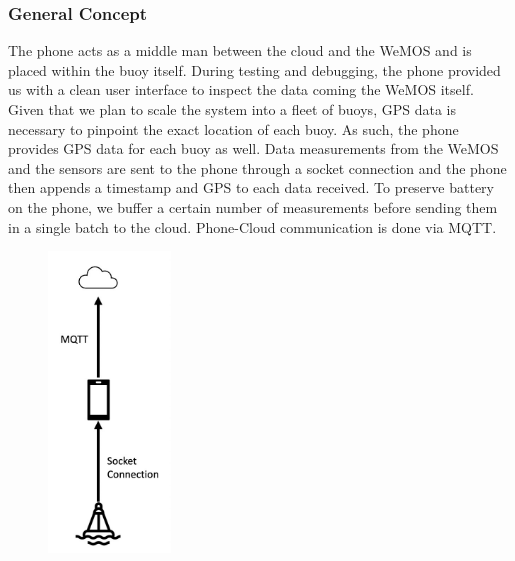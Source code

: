 \documentclass{article}
\begin{document}
\subsubsection{General Concept}
\begin{multicols}{2}
The phone acts as a middle man between the cloud and the WeMOS and is placed within the buoy itself. During testing and debugging, the phone provided us with a clean user interface to inspect the data coming the WeMOS itself. Given that we plan to scale the system into a fleet of buoys, GPS data is necessary to pinpoint the exact location of each buoy. As such, the phone provides GPS data for each buoy as well. Data measurements from the WeMOS and the sensors are sent to the phone through a socket connection and the phone then appends a timestamp and GPS to each data received. To preserve battery on the phone, we buffer a certain number of measurements before sending them in a single batch to the cloud. Phone-Cloud communication is done via MQTT.
\begin{figure}[H]
    \centering
    \includegraphics[height=8cm]{report/images/phone_app_concept.png}
    
    \label{fig:my_label}
\end{figure}
\end{multicols}
\end{document}
